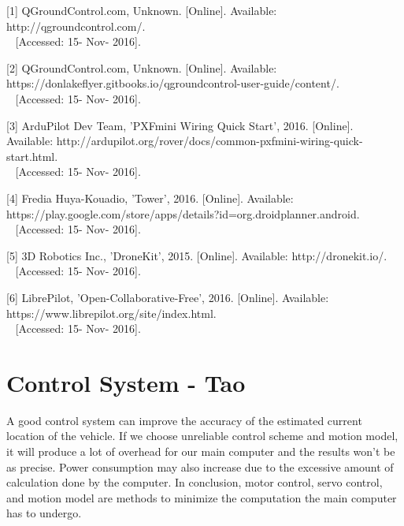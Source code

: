 \documentclass[compsoc,draftclsnofoot,onecolumn,10pt]{IEEEtran}
\begin{document}
[1] QGroundControl.com, Unknown. [Online]. Available: http://qgroundcontrol.com/.\\~
[Accessed: 15- Nov- 2016].\par

[2] QGroundControl.com, Unknown. [Online]. 
Available: https://donlakeflyer.gitbooks.io/qgroundcontrol-user-guide/content/.\\~
[Accessed: 15- Nov- 2016].\par

[3] ArduPilot Dev Team, 'PXFmini Wiring Quick Start', 2016. [Online]. 
Available: http://ardupilot.org/rover/docs/common-pxfmini-wiring-quick-start.html.\\~
[Accessed: 15- Nov- 2016].\par

[4] Fredia Huya-Kouadio, 'Tower', 2016. [Online]. 
Available: https://play.google.com/store/apps/details?id=org.droidplanner.android.\\~
[Accessed: 15- Nov- 2016].\par

[5] 3D Robotics Inc., 'DroneKit', 2015. [Online]. Available: http://dronekit.io/.\\~
[Accessed: 15- Nov- 2016].\par

[6] LibrePilot, 'Open-Collaborative-Free', 2016. [Online]. Available: https://www.librepilot.org/site/index.html.\\~
[Accessed: 15- Nov- 2016].\par


\newpage

\section{Control System - Tao}
A good control system can improve the accuracy of the estimated current location 
of the vehicle. If we choose unreliable control scheme and motion model, it will 
produce a lot of overhead for our main computer and the results won't be as precise. 
Power consumption may also increase due to the excessive amount of calculation done 
by the computer. In conclusion, motor control, servo control, and motion model are 
methods to minimize the computation the main computer has to undergo.
\end{document}
